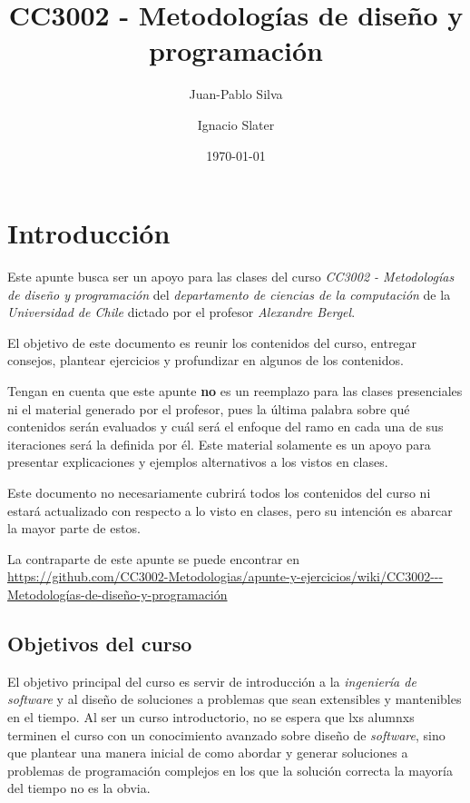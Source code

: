 \documentclass[12pt]{book}
\title{CC3002 - Metodologías de diseño y programación}
\author{Juan-Pablo Silva}
\author{Ignacio Slater}
\affil{Departamento de Ciencias de la Computación, Universidad de Chile}
\date{\today}
\theoremstyle{definition}
\begin{document}
  \frontmatter
  \maketitle
  \tableofcontents
  \chapter{Introducción}
    Este apunte busca ser un apoyo para las clases del curso \textit{CC3002 - Metodologías 
    de diseño y programación} del \textit{departamento de ciencias de la computación} de
    la \textit{Universidad de Chile} dictado por el profesor \textit{Alexandre Bergel}.

    El objetivo de este documento es reunir los contenidos del curso, entregar consejos,
    plantear ejercicios y profundizar en algunos de los contenidos.

    Tengan en cuenta que este apunte \textbf{no} es un reemplazo para las clases 
    presenciales ni el material generado por el profesor, pues la última palabra sobre qué 
    contenidos serán evaluados y cuál será el enfoque del ramo en cada una de sus 
    iteraciones será la definida por él.
    Este material solamente es un apoyo para presentar explicaciones y ejemplos 
    alternativos a los vistos en clases.

    Este documento no necesariamente cubrirá todos los contenidos del curso ni estará 
    actualizado con respecto a lo visto en clases, pero su intención es abarcar la mayor
    parte de estos.

    La contraparte de este apunte se puede encontrar en 
    \url{https://github.com/CC3002-Metodologias/apunte-y-ejercicios/wiki/CC3002---Metodologías-de-diseño-y-programación}

    \section*{Objetivos del curso}
      El objetivo principal del curso es servir de introducción a la \textit{ingeniería de
      software} y al diseño de soluciones a problemas que sean extensibles y mantenibles
      en el tiempo.
      Al ser un curso introductorio, no se espera que lxs alumnxs terminen el curso con un
      conocimiento avanzado sobre diseño de \textit{software}, sino que plantear una 
      manera inicial de como abordar y generar soluciones a problemas de programación
      complejos en los que la solución correcta la mayoría del tiempo no es la obvia.
\end{document}
